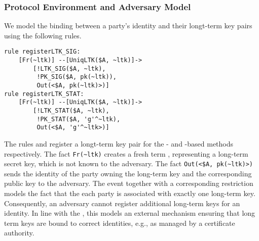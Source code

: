 \subsubsection{Protocol Environment and Adversary Model}
We model the binding between a party's identity and their longt-term
key pairs using the following rules.
%
\begin{small}
\begin{verbatim}
rule registerLTK_SIG:
    [Fr(~ltk)] --[UniqLTK($A, ~ltk)]->
        [!LTK_SIG($A, ~ltk),
         !PK_SIG($A, pk(~ltk)),
         Out(<$A, pk(~ltk)>)]
rule registerLTK_STAT:
    [Fr(~ltk)] --[UniqLTK($A, ~ltk)]->
        [!LTK_STAT($A, ~ltk),
         !PK_STAT($A, 'g'^~ltk),
         Out(<$A, 'g'^~ltk>)]
\end{verbatim}
\end{small}
%
The rules  and  register a longt-term
key pair for the \mSig{}- and \mStat{}-based methods respectively.
%
The fact \verb|Fr(~ltk)| creates a fresh term , representing a long-term
secret key, which is not known to the adversary.
%
The fact \verb|Out(<$A, pk(~ltk)>)| sends the identity of the party
owning the long-term key and the corresponding public key to the adversary.
%
The event  together with a corresponding restriction models the fact
that the each party is associated with exactly one long-term key.
%
Consequently, an adversary cannot register additional long-term keys for an
identity.
%
In line with the \mEdhoc{} \mSpec{}, this models an external mechanism
ensuring that long term keys are bound to correct identities, e.g., as
managed by a certificate authority.
%

